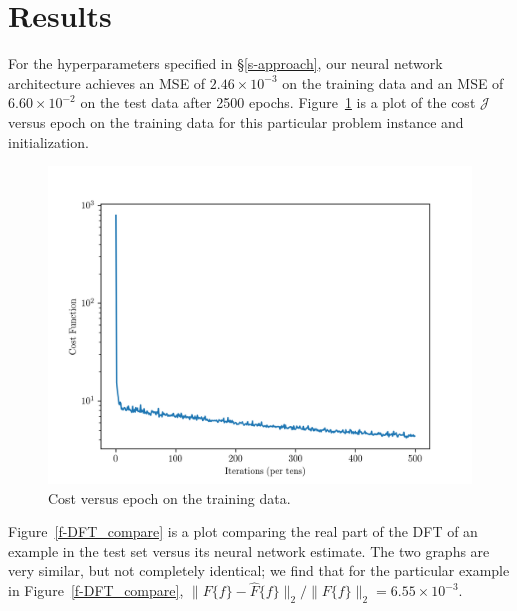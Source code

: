 \documentclass[12pt]{article}
\begin{document}
\section{Results} For the hyperparameters specified in \S\ref{s-approach}, our neural network architecture achieves 
an MSE of $2.46 \times 10^{-3}$ on the training data and an MSE of $6.60 \times 10^{-2}$ on the test data after 2500 
epochs. Figure~\ref{f-example_cost_vs_epoch} is a plot of the cost $\mathcal J$ versus epoch on the training data for this particular 
problem instance and initialization.

\begin{figure}
\centering
\includegraphics[scale=.75]{figures/final_cost_vs_epoch.png}
\caption{Cost versus epoch on the training data.}
\label{f-example_cost_vs_epoch}
\end{figure}

Figure~\ref{f-DFT_compare} is a plot comparing the real part of the DFT of an example in the test set 
versus its neural network estimate. The two graphs are very similar, but not completely identical; we 
find that for the particular example in Figure~\ref{f-DFT_compare}, 
$\|F\{f\} - \hat{F}\{f\}\|_2 / \|F\{f\}\|_2 = 6.55 \times 10^{-3}.$
\end{document}
